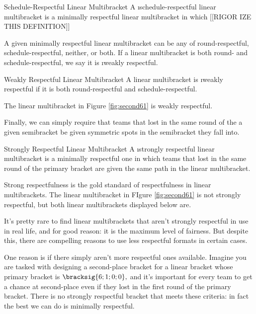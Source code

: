 {    \begin{definition}{Schedule-Respectful Linear Multibracket}{}
        A \i{schedule-respectful} linear multibracket is a minimally respectful linear multibracket in which [[RIGOR IZE THIS DEFINITION]]
    \end{definition}

    A given minimally respectful linear multibracket can be any of round-respectful, schedule-respectful, neither, or both. If a linear multibracket is both round- and schedule-respectful, we say it is \i{weakly respectful}.

    \begin{definition}{Weakly Respectful Linear Multibracket}{}
        A linear multibracket is \i{weakly respectful} if it is both round-respectful and schedule-respectful.
    \end{definition}

    The linear multibracket in Figure \ref{fig:second61} is weakly respectful.


    Finally, we can simply require that teams that lost in the same round of the a given semibracket be given symmetric spots in the semibracket they fall into.

    \begin{definition}{Strongly Respectful Linear Multibracket}{}
        A \i{strongly respectful} linear multibracket is a minimally respectful one in which teams that lost in the same round of the primary bracket are given the same path in the linear multibracket.
    \end{definition}

    Strong respectfulness is the gold standard of respectfulness in linear multibrackets. The linear multibracket in FIgure \ref{fig:second61} is not strongly respectful, but both linear multibrackets displayed below are.


    It's pretty rare to find linear multibrackets that aren't strongly respectful in use in real life, and for good reason: it is the maximum level of fairness. But despite this, there are compelling reasons to use less respectful formats in certain cases.

    One reason is if there simply aren't more respectful ones available. Imagine you are tasked with designing a second-place bracket for a linear bracket whose primary bracket is $\bracksig{6;1;0;0},$ and it's important for every team to get a chance at second-place even if they lost in the first round of the primary bracket. There is no strongly respectful bracket that meets these criteria: in fact the best we can do is minimally respectful.

}
